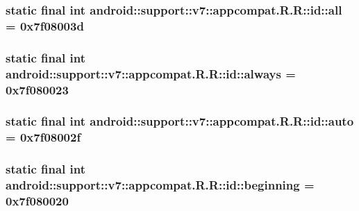 \hypertarget{classandroid_1_1support_1_1v7_1_1appcompat_1_1_r_1_1id_0edd8b4982bfee84489962b01462c7c3}{
\subsubsection[{all}]{\setlength{\rightskip}{0pt plus 5cm}static final int android::support::v7::appcompat.R.R::id::all = 0x7f08003d}}
\label{classandroid_1_1support_1_1v7_1_1appcompat_1_1_r_1_1id_0edd8b4982bfee84489962b01462c7c3}


\hypertarget{classandroid_1_1support_1_1v7_1_1appcompat_1_1_r_1_1id_bdfd3b6b6bdb0cdfbca297a7d3651597}{
\subsubsection[{always}]{\setlength{\rightskip}{0pt plus 5cm}static final int android::support::v7::appcompat.R.R::id::always = 0x7f080023}}
\label{classandroid_1_1support_1_1v7_1_1appcompat_1_1_r_1_1id_bdfd3b6b6bdb0cdfbca297a7d3651597}


\hypertarget{classandroid_1_1support_1_1v7_1_1appcompat_1_1_r_1_1id_45e5f2fcb71b37af2b579e02c67b9a82}{
\subsubsection[{auto}]{\setlength{\rightskip}{0pt plus 5cm}static final int android::support::v7::appcompat.R.R::id::auto = 0x7f08002f}}
\label{classandroid_1_1support_1_1v7_1_1appcompat_1_1_r_1_1id_45e5f2fcb71b37af2b579e02c67b9a82}


\hypertarget{classandroid_1_1support_1_1v7_1_1appcompat_1_1_r_1_1id_de390e41ab2147ac148fa255b2072e23}{
\subsubsection[{beginning}]{\setlength{\rightskip}{0pt plus 5cm}static final int android::support::v7::appcompat.R.R::id::beginning = 0x7f080020}}
\label{classandroid_1_1support_1_1v7_1_1appcompat_1_1_r_1_1id_de390e41ab2147ac148fa255b2072e23}


